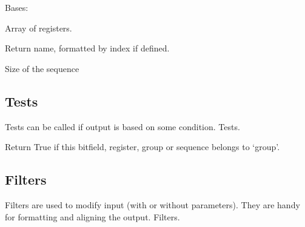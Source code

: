 \documentclass[letterpaper,10pt,english]{sphinxmanual}
\begin{document}
\begin{fulllineitems}
\label{\detokenize{developer:wuppercodegen.classes.Sequence}}
Bases: {\hyperref[\detokenize{developer:wuppercodegen.classes.Group}]{}}

Array of registers.

\begin{fulllineitems}
\label{\detokenize{developer:wuppercodegen.classes.Sequence.full_name}}
Return name, formatted by index if defined.

\end{fulllineitems}


\begin{fulllineitems}
\label{\detokenize{developer:wuppercodegen.classes.Sequence.number}}
Size of the sequence

\end{fulllineitems}


\end{fulllineitems}



\subsection{Tests}
\label{\detokenize{developer:tests}}
Tests can be called if output is based on some condition.
\label{\detokenize{developer:module-wuppercodegen.test}}
Tests.

\begin{fulllineitems}
\label{\detokenize{developer:wuppercodegen.test.in_group}}
Return True if this bitfield, register, group or sequence belongs to `group'.

\end{fulllineitems}



\subsection{Filters}
\label{\detokenize{developer:filters}}
Filters are used to modify input (with or without parameters). They are handy for
formatting and aligning the output.
\label{\detokenize{developer:module-wuppercodegen.filter}}
Filters.
\end{document}
